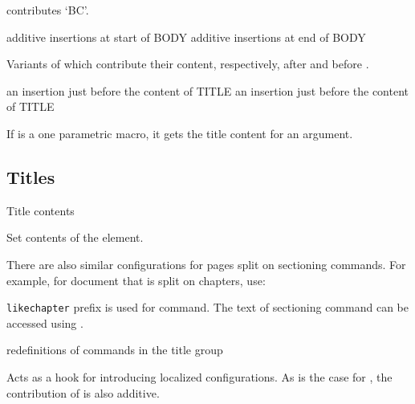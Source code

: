 \begin{texsource}
\end{texsource}

contributes `BC'.


 {additive insertions at start of BODY}\EndDoc
{} {additive insertions at end of BODY}\EndDoc

   Variants of  which contribute their content,
   respectively, after  and before .

 {an insertion just before the content of TITLE}\EndDoc
{} {an insertion just before the content of TITLE}\EndDoc

If  is a one parametric macro, it gets the title content for an
argument.



\subsection{Titles}

 {Title contents}\EndDoc

Set contents of the  element.

There are also similar configurations for pages split on sectioning commands. For example, for document that
is split on chapters, use:

\begin{texsource}
\end{texsource}

\texttt{likechapter} prefix is used for \texcommand{\chapter*} command. The text of sectioning command
can be accessed using .

 {redefinitions of commands in the title group} \EndDoc

Acts as a hook for introducing localized configurations. As is the case for
, the contribution of  is also
additive.


